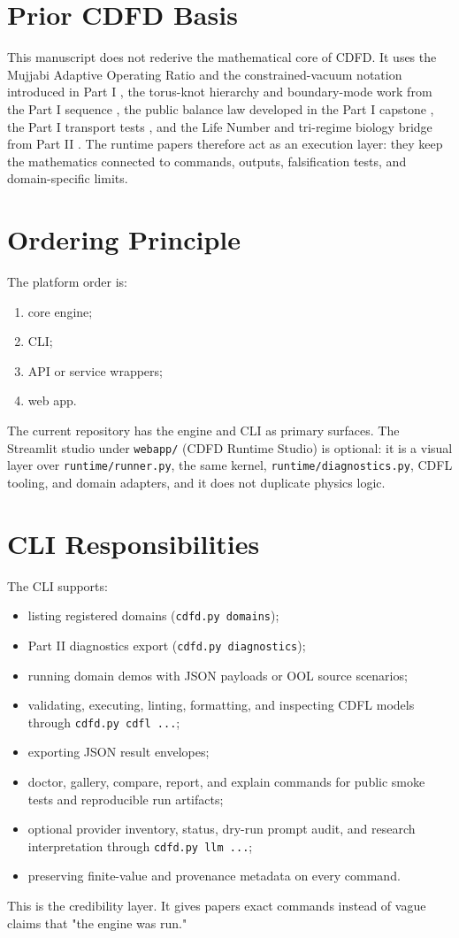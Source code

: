 \documentclass[12pt,a4paper]{article}
\begin{document}
\section{Prior CDFD Basis}
This manuscript does not rederive the mathematical core of CDFD. It uses the
Mujjabi Adaptive Operating Ratio and the constrained-vacuum notation introduced
in Part I \cite{MujjabiI2026}, the torus-knot hierarchy and boundary-mode work
from the Part I sequence \cite{MujjabiVI2026,MujjabiIX2026}, the public balance
law developed in the Part I capstone \cite{MujjabiX2026}, the Part I transport
tests \cite{MujjabiXII2026}, and the Life Number and tri-regime biology bridge
from Part II \cite{MujjabiPartII2026}. The runtime papers therefore act as an
execution layer: they keep the mathematics connected to commands, outputs,
falsification tests, and domain-specific limits.


\section{Ordering Principle}
The platform order is:
\begin{enumerate}
    \item core engine;
    \item CLI;
    \item API or service wrappers;
    \item web app.
\end{enumerate}
The current repository has the engine and CLI as primary surfaces. The Streamlit
studio under \texttt{webapp/} (CDFD Runtime Studio) is optional: it is a visual
layer over \texttt{runtime/runner.py}, the same kernel,
\texttt{runtime/diagnostics.py}, CDFL tooling, and domain adapters, and it does
not duplicate physics logic.

\section{CLI Responsibilities}
The CLI supports:
\begin{itemize}
    \item listing registered domains (\texttt{cdfd.py domains});
    \item Part II diagnostics export (\texttt{cdfd.py diagnostics});
    \item running domain demos with JSON payloads or OOL source scenarios;
    \item validating, executing, linting, formatting, and inspecting CDFL models
    through \texttt{cdfd.py cdfl ...};
    \item exporting JSON result envelopes;
    \item doctor, gallery, compare, report, and explain commands for public
    smoke tests and reproducible run artifacts;
    \item optional provider inventory, status, dry-run prompt audit, and
    research interpretation through \texttt{cdfd.py llm ...};
    \item preserving finite-value and provenance metadata on every command.
\end{itemize}
This is the credibility layer. It gives papers exact commands instead of vague
claims that "the engine was run."
\end{document}
